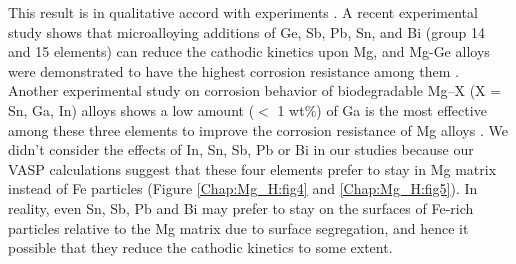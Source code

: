 This result is in qualitative accord with experiments \cite{liu2016controlling,birbilis2014evidence}. A recent experimental study shows that microalloying additions of Ge, Sb, Pb, Sn, and Bi (group 14 and 15 elements) can reduce the cathodic kinetics upon Mg, and Mg-Ge alloys were demonstrated to have the highest corrosion resistance among them \cite{liu2018simultaneously}. Another experimental study on corrosion behavior of biodegradable Mg–X (X = Sn, Ga, In) alloys shows a low amount ($<$ 1 wt$\%$) of Ga is the most effective among these three elements to improve the corrosion resistance of Mg alloys \cite{kubasek2013structure}. We didn't consider the effects of In, Sn, Sb, Pb or Bi in our studies because our \ac{VASP} calculations suggest that these four elements prefer to stay in Mg matrix instead of Fe particles (Figure \ref{Chap:Mg_H:fig4} and \ref{Chap:Mg_H:fig5}). In reality, even Sn, Sb, Pb and Bi may prefer to stay on the surfaces of Fe-rich particles relative to the Mg matrix due to surface segregation, and hence it possible that they reduce the cathodic kinetics to some extent.

